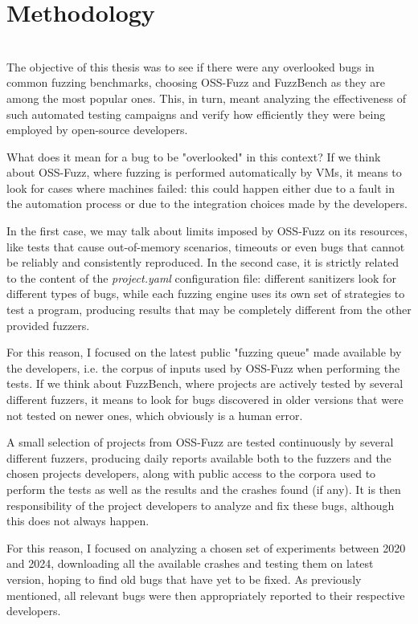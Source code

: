 
\chapter{Methodology} \label{chap_3}
\ \\
The objective of this thesis was to see if there were any overlooked bugs in common fuzzing benchmarks, choosing OSS-Fuzz and FuzzBench as they are among the most popular ones. This, in turn, meant analyzing the effectiveness of such automated testing campaigns and verify how efficiently they were being employed by open-source developers.

What does it mean for a bug to be "overlooked" in this context? 
If we think about OSS-Fuzz, where fuzzing is performed automatically by VMs, it means to look for cases where machines failed: this could happen either due to a fault in the automation process or due to the integration choices made by the developers.

In the first case, we may talk about limits imposed by OSS-Fuzz on its resources, like tests that cause out-of-memory scenarios, timeouts or even bugs that cannot be reliably and consistently reproduced. 
In the second case, it is strictly related to the content of the \textit{project.yaml} configuration file: different sanitizers look for different types of bugs, while each fuzzing engine uses its own set of strategies to test a program, producing results that may be completely different from the other provided fuzzers.

For this reason, I focused on the latest public "fuzzing queue" made available by the developers, i.e. the corpus of inputs used by OSS-Fuzz when performing the tests.
If we think about FuzzBench, where projects are actively tested by several different fuzzers, it means to look for bugs discovered in older versions that were not tested on newer ones, which obviously is a human error.

A small selection of projects from OSS-Fuzz are tested continuously by several different fuzzers, producing daily reports available both to the fuzzers and the chosen projects developers, along with public access to the corpora used to perform the tests as well as the results and the crashes found (if any). It is then responsibility of the project developers to analyze and fix these bugs, although this does not always happen.

For this reason, I focused on analyzing a chosen set of experiments between 2020 and 2024, downloading all the available crashes and testing them on latest version, hoping to find old bugs that have yet to be fixed.
As previously mentioned, all relevant bugs were then appropriately reported to their respective developers.



